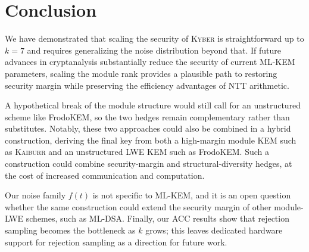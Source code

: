 \section{Conclusion}
\label{sec:conclusion}

We have demonstrated that scaling the security of \textsc{Kyber} is straightforward up to $k=7$ and 
requires generalizing the noise distribution beyond that. If future advances in cryptanalysis substantially reduce the security of 
current ML-KEM parameters, scaling the module rank provides a plausible path to restoring security margin while preserving the efficiency 
advantages of NTT arithmetic.

A hypothetical break of the module structure would still call for an unstructured scheme like FrodoKEM, so the two hedges remain complementary 
rather than substitutes. Notably, these two approaches could also be combined in a hybrid construction, deriving the final key from both a high-margin 
module KEM such as \textsc{Kaiburr} and an unstructured LWE KEM such as FrodoKEM. Such a construction could combine security-margin and structural-diversity 
hedges, at the cost of increased communication and computation.

Our noise family $f(t)$ is not specific to ML-KEM, and it is an open question whether the same construction could extend the security margin of other 
module-LWE schemes, such as ML-DSA. Finally, our ACC results show that rejection sampling becomes the bottleneck as $k$ grows; this leaves dedicated 
hardware support for rejection sampling as a direction for future work.